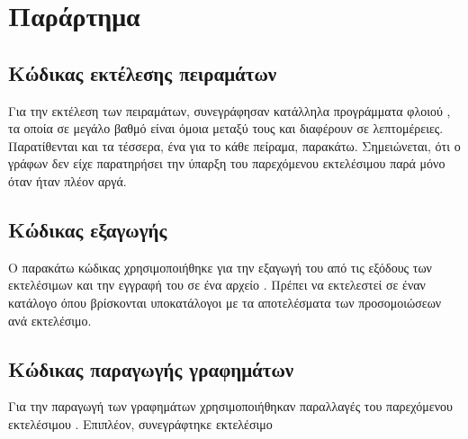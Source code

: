 
\clearpage
\section{Παράρτημα}
\subsection{Κώδικας εκτέλεσης πειραμάτων}

Για την εκτέλεση των πειραμάτων, συνεγράφησαν κατάλληλα προγράμματα φλοιού , τα οποία σε μεγάλο βαθμό είναι όμοια μεταξύ τους και διαφέρουν σε λεπτομέρειες. Παρατίθενται και τα τέσσερα, ένα για το κάθε πείραμα, παρακάτω. Σημειώνεται, ότι ο γράφων δεν είχε παρατηρήσει την ύπαρξη του παρεχόμενου εκτελέσιμου παρά μόνο όταν ήταν πλέον αργά.

\clearpage
{}


\clearpage
{}


\clearpage
{}


\clearpage
{}


\subsection{Κώδικας εξαγωγής }

Ο παρακάτω κώδικας χρησιμοποιήθηκε για την εξαγωγή του  από τις εξόδους των εκτελέσιμων και την εγγραφή του σε ένα αρχείο \texttt{}. Πρέπει να εκτελεστεί σε έναν κατάλογο όπου βρίσκονται υποκατάλογοι με τα αποτελέσματα των προσομοιώσεων ανά εκτελέσιμο.



\clearpage
\subsection{Κώδικας παραγωγής γραφημάτων}

Για την παραγωγή των γραφημάτων χρησιμοποιήθηκαν παραλλαγές του παρεχόμενου εκτελέσιμου \texttt{}. Επιπλέον, συνεγράφτηκε εκτελέσιμο \texttt{}


\clearpage

\clearpage

\clearpage

\clearpage

\clearpage


